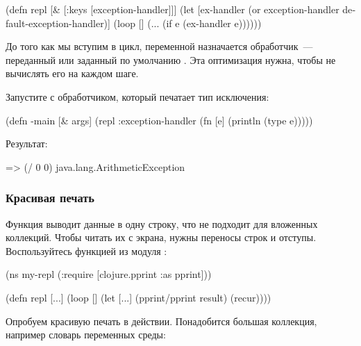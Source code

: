 \begin{english}
  \begin{clojure/lines}
(defn repl [& [{:keys [exception-handler]}]]
  (let [ex-handler
        (or exception-handler
            default-exception-handler)]
    (loop []
      (...
        (if e
          (ex-handler e))))))
  \end{clojure/lines}
\end{english}

До того как мы вступим в цикл, переменной  назначается обработчик~--- переданный или заданный по умолчанию . Эта оптимизация нужна, чтобы не вычислять его на каждом шаге.

Запустите  с обработчиком, который печатает тип исключения:

\begin{english}
  \begin{clojure}
(defn -main [& args]
  (repl {:exception-handler
         (fn [e] (println (type e)))}))
  \end{clojure}
\end{english}

Результат:

\begin{english}
  \begin{clojure}
=> (/ 0 0)
java.lang.ArithmeticException
  \end{clojure}
\end{english}

\subsubsection{Красивая печать}

Функция  выводит данные в одну строку, что не подходит для вложенных коллекций. Чтобы читать их с экрана, нужны переносы строк и отступы. Воспользуйтесь функцией  из модуля :

\begin{english}
  \begin{clojure}
(ns my-repl
  (:require
   [clojure.pprint :as pprint]))

(defn repl [...]
  (loop []
    (let [...]
      (pprint/pprint result)
      (recur))))
  \end{clojure}
\end{english}

Опробуем красивую печать в действии. Понадобится большая коллекция, например словарь переменных среды:

